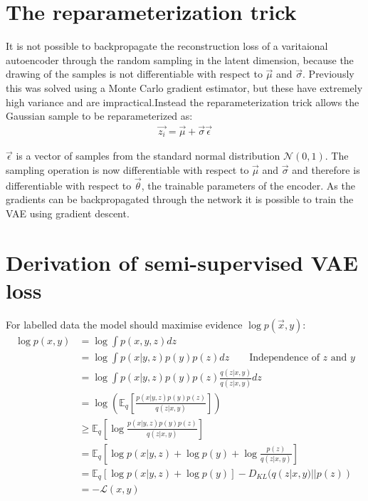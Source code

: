 \chapter{The reparameterization trick} \label{reparam}

It is not possible to backpropagate the reconstruction loss of a varitaional autoencoder through the random sampling in the latent dimension, because the drawing of
the samples is not differentiable with respect to $\vec{\mu}$ and $\vec{\sigma}$. Previously this was solved using a Monte Carlo gradient estimator, but these have 
extremely high variance and are impractical.Instead the reparameterization trick allows the Gaussian sample to be reparameterized as:
\begin{align}
  \vec{z_{i}} = \vec{\mu} + \vec{\sigma}\vec{\epsilon}
\end{align}

$\vec{\epsilon}$ is a vector of samples from the standard normal distribution $\mathcal{N}(0, 1)$. The sampling operation is now differentiable
with respect to $\vec{\mu}$ and $\vec{\sigma}$ and therefore is differentiable with respect to $\vec{\theta}$, the trainable parameters of the encoder. As the
gradients can be backpropagated through the network it is possible to train the VAE using gradient descent.

\chapter{Derivation of semi-supervised VAE loss} \label{ssvae_loss}

For labelled data the model should maximise evidence $\log p(\vec{x}, y)$:
\begingroup
\allowdisplaybreaks
\begin{align*}
  \log p(x, y) & = \log \int p(x, y, z) dz \\
  & = \log \int p(x|y, z)p(y)p(z) dz \qquad \text{Independence of $z$ and $y$}\\
  & = \log \int p(x|y, z)p(y)p(z) \frac{q(z|x, y)}{q(z|x, y)} dz\\
  & = \log\left(\mathbb{E}_q \left[\frac{p(x|y, z)p(y)p(z)}{q(z|x, y)}\right]\right) \\
  & \geq \mathbb{E}_q \left[\log\frac{p(x|y, z)p(y)p(z)}{q(z|x, y)}\right] \\
  & = \mathbb{E}_q \left[\log p(x|y, z) + \log p(y) + \log\frac{p(z)}{q(z|x, y)}\right] \\
  & = \mathbb{E}_q [\log p(x|y, z) + \log p(y)] - D_{KL}(q(z|x, y)||p(z)) \\
  & = -\mathcal{L}(x, y)
\end{align*}
\endgroup

